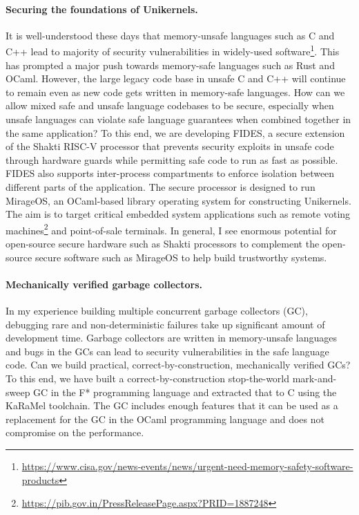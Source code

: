 \documentclass[screen,acmsmall,nonacm]{acmart}
\begin{document}
\paragraph{\bf Securing the foundations of Unikernels.} It is well-understood
these days that memory-unsafe languages such as C and C++ lead to majority of
security vulnerabilities in widely-used
software\footnote{\url{https://www.cisa.gov/news-events/news/urgent-need-memory-safety-software-products}}.
This has prompted a major push towards memory-safe languages such as Rust and
OCaml. However, the large legacy code base in unsafe C and C++ will continue to
remain even as new code gets written in memory-safe languages. How can we allow
mixed safe and unsafe language codebases to be secure, especially when unsafe
languages can violate safe language guarantees when combined together in the
same application? To this end, we are developing FIDES, a secure extension of
the Shakti RISC-V processor that prevents security exploits in unsafe code
through hardware guards while permitting safe code to run as fast as possible.
FIDES also supports inter-process compartments to enforce isolation between
different parts of the application. The secure processor is designed to run
MirageOS, an OCaml-based library operating system for constructing Unikernels.
The aim is to target critical embedded system applications such as remote
voting
machines\footnote{\url{https://pib.gov.in/PressReleasePage.aspx?PRID=1887248}}
and point-of-sale terminals. In general, I see enormous potential for
open-source secure hardware such as Shakti processors to complement the
open-source secure software such as MirageOS to help build trustworthy systems.

\paragraph{\bf Mechanically verified garbage collectors.} In my experience
building multiple concurrent garbage collectors (GC), debugging rare and
non-deterministic failures take up significant amount of development time.
Garbage collectors are written in memory-unsafe languages and bugs in the GCs
can lead to security vulnerabilities in the safe language code. Can we build
practical, correct-by-construction, mechanically verified GCs? To this end, we
have built a correct-by-construction stop-the-world mark-and-sweep GC in the F*
programming language and extracted that to C using the KaRaMel toolchain. The
GC includes enough features that it can be used as a replacement for the GC in
the OCaml programming language and does not compromise on the performance.
\end{document}
